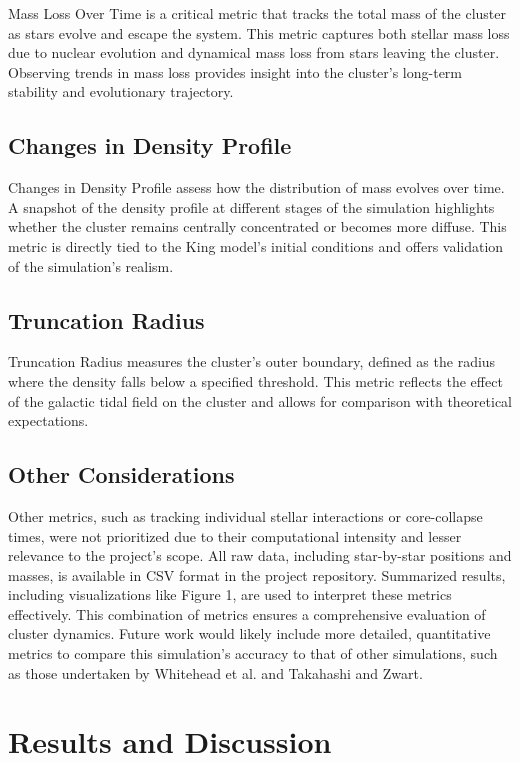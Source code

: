 \documentclass[10pt,twocolumn]{article}
\begin{document}
Mass Loss Over Time is a critical metric that tracks the total mass of the cluster as stars evolve and escape the system. This metric captures both stellar mass loss due to nuclear evolution and dynamical mass loss from stars leaving the cluster. Observing trends in mass loss provides insight into the cluster's long-term stability and evolutionary trajectory.

\subsection{Changes in Density Profile}

Changes in Density Profile assess how the distribution of mass evolves over time. A snapshot of the density profile at different stages of the simulation highlights whether the cluster remains centrally concentrated or becomes more diffuse. This metric is directly tied to the King model's initial conditions and offers validation of the simulation's realism.

\subsection{Truncation Radius}

Truncation Radius measures the cluster's outer boundary, defined as the radius where the density falls below a specified threshold. This metric reflects the effect of the galactic tidal field on the cluster and allows for comparison with theoretical expectations.

\subsection{Other Considerations}

Other metrics, such as tracking individual stellar interactions or core-collapse times, were not prioritized due to their computational intensity and lesser relevance to the project’s scope. All raw data, including star-by-star positions and masses, is available in CSV format in the project repository. Summarized results, including visualizations like Figure 1, are used to interpret these metrics effectively. This combination of metrics ensures a comprehensive evaluation of cluster dynamics. Future work would likely include more detailed, quantitative metrics to compare this simulation’s accuracy to that of other simulations, such as those undertaken by Whitehead et al. and Takahashi and Zwart.

\section{Results and Discussion}
\end{document}
